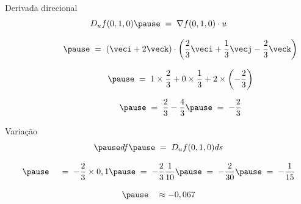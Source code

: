 \begin{resolution}{Derivada direcional}
  \[
    D_u f(0, 1, 0)
    \pause
    \;=\; \nabla f(0, 1, 0) \cdot u
  \]

  \[
    \hphantom{D_u f(0, 1, 0)}
    \pause
    \;=\; \left(\veci + 2\veck\right)
    \cdot
    \left(\frac{2}{3} \veci + \frac{1}{3} \vecj - \frac{2}{3} \veck\right)
  \]

  \[
    \hphantom{D_u f(0, 1, 0)}
    \pause
    \;=\; 1\times\frac{2}{3} + 0\times\frac{1}{3} + 2 \times\left(- \frac{2}{3}\right)
  \]

  \[
    \hphantom{D_u f(0, 1, 0)}
    \pause
    \;=\; \frac{2}{3} - \frac{4}{3}
    \pause
    \;=\; -\frac{2}{3}
  \]
\end{resolution}

\begin{resolution}{Variação}
  \[
    \pause
    df
    \pause
    \;=\; D_u f(0, 1, 0) ds
  \]

  \[
    \pause
    \hphantom{df}
    \;=\; -\frac{2}{3}\times 0,1
    \pause
    \;=\; -\frac{2}{3} \frac{1}{10}
    \pause
    \;=\; -\frac{2}{30}
    \pause
    \;=\; -\frac{1}{15}
  \]

  \[
    \pause
    \hphantom{df}
    \approx -0,067
  \]
\end{resolution}

